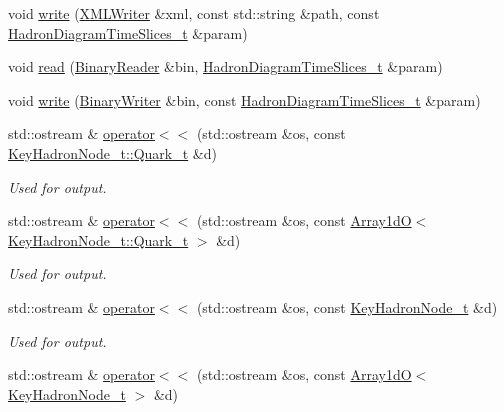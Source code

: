 \begin{DoxyCompactItemize}
\item 
void \mbox{\hyperlink{namespaceHadron_ac03bbcefc730bcb21021dc5c45a1b365}{write}} (\mbox{\hyperlink{classADATXML_1_1XMLWriter}{X\+M\+L\+Writer}} \&xml, const std\+::string \&path, const \mbox{\hyperlink{structHadron_1_1HadronDiagramTimeSlices__t}{Hadron\+Diagram\+Time\+Slices\+\_\+t}} \&param)
\item 
void \mbox{\hyperlink{namespaceHadron_a638347ea091d8f1823241f5551abb96e}{read}} (\mbox{\hyperlink{classADATIO_1_1BinaryReader}{Binary\+Reader}} \&bin, \mbox{\hyperlink{structHadron_1_1HadronDiagramTimeSlices__t}{Hadron\+Diagram\+Time\+Slices\+\_\+t}} \&param)
\item 
void \mbox{\hyperlink{namespaceHadron_a70fe8dc6184653dde216306a0f4681d9}{write}} (\mbox{\hyperlink{classADATIO_1_1BinaryWriter}{Binary\+Writer}} \&bin, const \mbox{\hyperlink{structHadron_1_1HadronDiagramTimeSlices__t}{Hadron\+Diagram\+Time\+Slices\+\_\+t}} \&param)
\item 
std\+::ostream \& \mbox{\hyperlink{namespaceHadron_a0c52fe94d4afb343c44206908152316e}{operator$<$$<$}} (std\+::ostream \&os, const \mbox{\hyperlink{structHadron_1_1KeyHadronNode__t_1_1Quark__t}{Key\+Hadron\+Node\+\_\+t\+::\+Quark\+\_\+t}} \&d)
\begin{DoxyCompactList}\small\item\em Used for output. \end{DoxyCompactList}\item 
std\+::ostream \& \mbox{\hyperlink{namespaceHadron_adc0e10e53889cf8575df386122424913}{operator$<$$<$}} (std\+::ostream \&os, const \mbox{\hyperlink{classADAT_1_1Array1dO}{Array1dO}}$<$ \mbox{\hyperlink{structHadron_1_1KeyHadronNode__t_1_1Quark__t}{Key\+Hadron\+Node\+\_\+t\+::\+Quark\+\_\+t}} $>$ \&d)
\begin{DoxyCompactList}\small\item\em Used for output. \end{DoxyCompactList}\item 
std\+::ostream \& \mbox{\hyperlink{namespaceHadron_accc8a0a89713671c3a48ac45536eac45}{operator$<$$<$}} (std\+::ostream \&os, const \mbox{\hyperlink{structHadron_1_1KeyHadronNode__t}{Key\+Hadron\+Node\+\_\+t}} \&d)
\begin{DoxyCompactList}\small\item\em Used for output. \end{DoxyCompactList}\item 
std\+::ostream \& \mbox{\hyperlink{namespaceHadron_a243db37c66ec71b086f54a64d62fa659}{operator$<$$<$}} (std\+::ostream \&os, const \mbox{\hyperlink{classADAT_1_1Array1dO}{Array1dO}}$<$ \mbox{\hyperlink{structHadron_1_1KeyHadronNode__t}{Key\+Hadron\+Node\+\_\+t}} $>$ \&d)

\end{DoxyCompactItemize}
